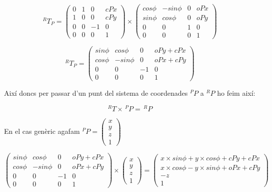 $$ ^RT_P = 
\left( \begin{array}{ccc|c}
0 & 1 &  0 & cPx\\
1 & 0 &  0 & cPy\\
0 & 0 & -1 &   0\\
\hline
0 & 0 &  0 & 1
\end{array} \right) \times
\left( \begin{array}{ccc|c}
cos \phi & -sin \phi &  0 & oPx\\
sin \phi &  cos \phi &  0 & oPy\\
0        &         0 &  1 &   0\\
\hline
0 & 0 &  0 & 1
\end{array} \right) $$

$$ ^RT_P = 
\left( \begin{array}{ccc|c}
sin \phi &  cos \phi &  0 & oPy + cPx\\
cos \phi & -sin \phi &  0 & oPx + cPy\\
0        &         0 & -1 &   0\\
\hline
0 & 0 &  0 & 1
\end{array} \right)$$

Així doncs per passar d'un punt del sistema de coordenades $^PP$ a $^RP$ ho
feim així:

$$^RT \times \,^PP = \,^RP$$

En el cas genèric agafam $^PP = 
\left( \begin{array}{c}
x \\
y \\
z \\
\hline
1
\end{array} \right)$

$$
\left( \begin{array}{ccc|c}
sin \phi &  cos \phi &  0 & oPy + cPx\\
cos \phi & -sin \phi &  0 & oPx + cPy\\
0        &         0 & -1 &   0\\
\hline
0 & 0 &  0 & 1
\end{array} \right)
\times
\left( \begin{array}{c}
x \\
y \\
z \\
\hline
1
\end{array} \right)
=
\left( \begin{array}{c}
x\times sin \phi + y \times cos \phi + cPy + cPx \\
x\times cos \phi - y \times sin \phi + oPx + cPy \\
-z \\
\hline
1
\end{array} \right)
$$

